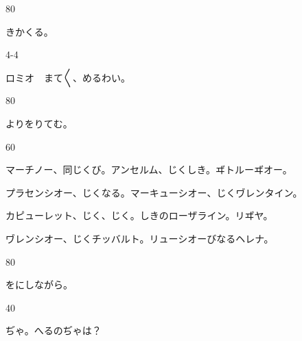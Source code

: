 \documentclass[tate,paper=b6j,jafontsize=9pt]{jlreq}
\begin{document}
\begin{azconvIndented}{8\zw}{0\zw}

きかくる。

\end{azconvIndented}
\begin{azconvIndented}{4\zw}{-4\zw}

ロミオ　まて{〳〵}、めるわい。

\end{azconvIndented}
\begin{azconvIndented}{8\zw}{0\zw}

よりをりてむ。

\end{azconvIndented}
\begin{azconvIndented}{6\zw}{0\zw}

マーチノー、同じくび。アンセルム、じくしき。ヸトルーヸオー。

プラセンシオー、じくなる。マーキューシオー、じくヷレンタイン。

カピューレット、じく、じく。しきのローザライン。リヸヤ。

ヷレンシオー、じくチッバルト。リューシオーびなるヘレナ。

\end{azconvIndented}
\begin{azconvIndented}{8\zw}{0\zw}

をにしながら。

\end{azconvIndented}
\begin{azconvIndented}{4\zw}{0\zw}

ぢゃ。へるのぢゃは？

\end{azconvIndented}
\end{document}
